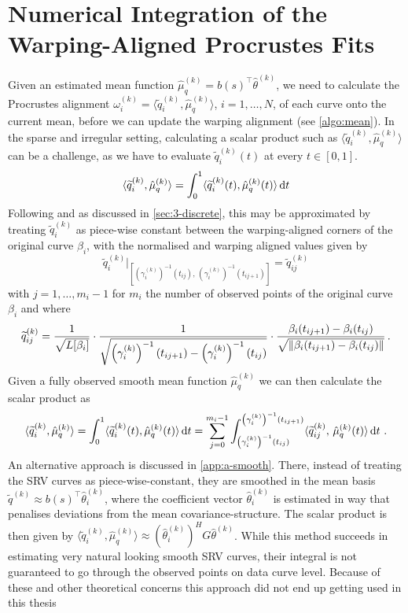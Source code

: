 \section{Numerical Integration of the Warping-Aligned Procrustes Fits}
\label{sec:3-pfits}
Given an estimated mean function $\hat\mu_q^{(k)} = b(s)^\top\hat\theta^{(k)}$, we need to calculate the Procrustes alignment $\omega_i^{(k)} = \langle \widetilde q_i^{(k)}, \hat\mu_q^{(k)} \rangle$, $i = 1,\dots,N$, of each curve onto the current mean, before we can update the warping alignment (see \cref{algo:mean}).
In the sparse and irregular setting, calculating a scalar product such as $\langle \widetilde q_i^{(k)}, \hat\mu_q^{(k)} \rangle$ can be a challenge, as we have to evaluate $\widetilde q_i^{(k)}(t)$ at every $t \in [0,1]$.
\begin{equation}
\langle \widetilde q_i^{(k)}, \hat\mu_q^{(k)} \rangle =
  \int_0^1 \langle \widetilde q_i^{(k)}(t), \hat\mu_q^{(k)}(t) \rangle \mathop{\mathrm{d}t}
\end{equation}
Following \cite{Steyer2021} and as discussed in \cref{sec:3-discrete}, this may be approximated by treating $\widetilde q_i^{(k)}$ as piece-wise constant between the warping-aligned corners of the original curve $\beta_i$, with the normalised and warping aligned values given by
\begin{equation}
   \widetilde q_i^{(k)} \Big\rvert_{\left[\left(\gamma_i^{(k)}\right)^{-1}(t_{ij}),\, \left(\gamma_i^{(k)} \right)^{-1}(t_{ij+1})\right]} =
  \widetilde q_{ij}^{(k)}
\end{equation}
with $j = 1, \dots, m_i - 1$ for $m_i$ the number of observed points of the original curve $\beta_i$ and where
\begin{equation}
  \widetilde q_{ij}^{(k)} = 
  \frac{1}{\sqrt{L[\beta_i]}}\cdot \frac{1}{\sqrt{\left(\gamma_i^{(k)}\right)^{-1}(t_{ij+1}) - \left(\gamma_i^{(k)}\right)^{-1}(t_{ij})}} \cdot \frac{\beta_i(t_{ij+1}) - \beta_i(t_{ij})}{\sqrt{\lVert\beta_i(t_{ij+1}) - \beta_i(t_{ij})\rVert}} \,.
\end{equation}
Given a fully observed smooth mean function $\hat\mu_q^{(k)}$ we can then calculate the scalar product as
\begin{equation}
\langle \widetilde q_i^{(k)}, \hat\mu_q^{(k)} \rangle =
  \int_0^1 \langle \widetilde q_i^{(k)}(t), \hat\mu_q^{(k)}(t) \rangle \mathop{\mathrm{d}t} =
  \sum_{j=0}^{m_i-1} \int_{\left(\gamma_i^{(k)}\right)^{-1}(t_{ij})}^{\left(\gamma_i^{(k)}\right)^{-1}(t_{ij+1})} \langle \widetilde q_{ij}^{(k)},\, \hat\mu_q^{(k)} (t) \rangle \mathop{\mathrm{d}t} \,.
\end{equation}
An alternative approach is discussed in \cref{app:a-smooth}.
There, instead of treating the SRV curves as piece-wise-constant, they are smoothed in the mean basis $\widetilde q^{(k)} \approx b(s)^\top \hat\theta_i^{(k)}$, where the coefficient vector $\hat\theta_i^{(k)}$ is estimated in way that penalises deviations from the mean covariance-structure.
The scalar product is then given by $\langle \widetilde q_i^{(k)}, \hat\mu_q^{(k)} \rangle \approx (\hat\theta_i^{(k)})^H G \hat\theta^{(k)}$.
While this method succeeds in estimating very natural looking smooth SRV curves, their integral is not guaranteed to go through the observed points on data curve level.
Because of these and other theoretical concerns this approach did not end up getting used in this thesis
